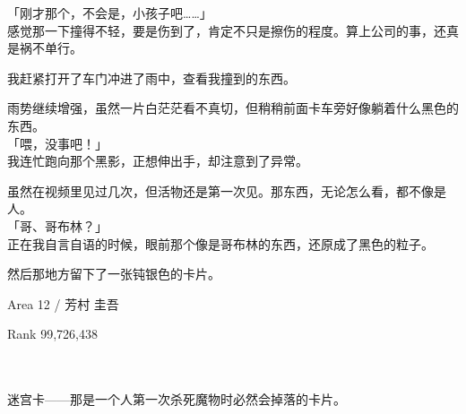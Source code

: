 「刚才那个，不会是，小孩子吧……」\\

感觉那一下撞得不轻，要是伤到了，肯定不只是擦伤的程度。算上公司的事，还真是祸不单行。

我赶紧打开了车门冲进了雨中，查看我撞到的东西。

雨势继续增强，虽然一片白茫茫看不真切，但稍稍前面卡车旁好像躺着什么黑色的东西。\\

「喂，没事吧！」\\

我连忙跑向那个黑影，正想伸出手，却注意到了异常。

虽然在视频里见过几次，但活物还是第一次见。那东西，无论怎么看，都不像是人。\\

「哥、哥布林？」\\

正在我自言自语的时候，眼前那个像是哥布林的东西，还原成了黑色的粒子。

然后那地方留下了一张钝银色的卡片。\\

\cardline

  Area 12 / 芳村 圭吾

  Rank 99,726,438

\cardline\\\\

迷宫卡——那是一个人第一次杀死魔物时必然会掉落的卡片。\\

